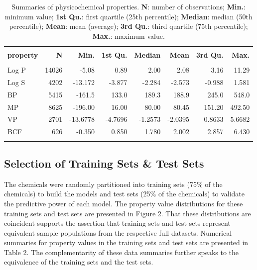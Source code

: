 \documentclass[10pt, letter]{article}
\renewcommand{\=}{\, =\, }
\newcommand{\+}{\, +\, }
\renewcommand{\-}{\, -\, }
\begin{document}
\begin{table}[H]
\begin{center}
\begin{tabular}{lrrrrrrr}
\toprule
&&\\
{\bf property} & {\bf N} & {\bf Min.} & {\bf 1st Qu.} &  {\bf Median}  & {\bf Mean}  & {\bf 3rd Qu.} & {\bf Max.}\\
\midrule
&&\\
Log P  &  14026 & -5.08 & 0.89 & 2.00 & 2.08 & 3.16 & 11.29\\
Log S  &  4202 & -13.172 & -3.877 & -2.284 & -2.573 & -0.988 & 1.581\\
BP  &   5415 &-161.5 & 133.0 & 189.3 & 188.9 & 245.0 & 548.0\\
MP  &   8625& -196.00 & 16.00 & 80.00 & 80.45 & 151.20 & 492.50\\
VP  &   2701 & -13.6778 & -4.7696 & -1.2573 & -2.0395 & 0.8633 & 5.6682\\
BCF  &  626 &  -0.350 & 0.850 & 1.780 & 2.002 & 2.857 & 6.430\\
&&\\
\bottomrule
\end{tabular}
\end{center}
\caption{Summaries of physicochemical properties. \textbf{N}: number of observations; \textbf{Min.}: minimum value; \textbf{1st Qu.}: first quartile (25th percentile);
\textbf{Median}: median (50th percentile); \textbf{Mean}: mean (average); \textbf{3rd Qu.}: third quartile (75th percentile);
\textbf{Max.}: maximum value.}
\end{table}


\subsection{Selection of Training Sets \& Test Sets}

The chemicals were randomly partitioned into training sets (75\% of the
chemicals) to build the models and test sets (25\% of the chemicals) to validate
the predictive power of each model. The property value distributions for these training sets and test sets are presented in Figure 2. That these distributions are coincident supports the assertion that training sets and test sets represent equivalent sample populations from the respective full datasets. Numerical summaries for property values in the training sets and test sets are presented in Table 2. The complementarity of these data summaries further speaks to the equivalence of the training sets and the test sets.
\end{document}

